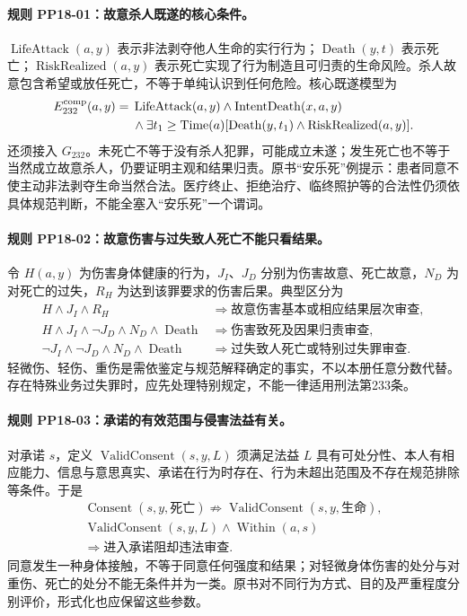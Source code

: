 \paragraph{规则 PP18-01：故意杀人既遂的核心条件。}
\mbox{}\par
$\operatorname{LifeAttack}(a,y)$ 表示非法剥夺他人生命的实行行为；$\operatorname{Death}(y,t)$ 表示死亡；$\operatorname{RiskRealized}(a,y)$ 表示死亡实现了行为制造且可归责的生命风险。杀人故意包含希望或放任死亡，不等于单纯认识到任何危险。核心既遂模型为
\[
\begin{aligned}
E_{232}^{\rm comp}(a,y)={}&\operatorname{LifeAttack}(a,y)
\land\operatorname{IntentDeath}(x,a,y)\\
&\land\exists t_1\ge\operatorname{Time}(a)
[\operatorname{Death}(y,t_1)\land\operatorname{RiskRealized}(a,y)].
\end{aligned}
\]
还须接入 $G_{232}$。未死亡不等于没有杀人犯罪，可能成立未遂；发生死亡也不等于当然成立故意杀人，仍要证明主观和结果归责。原书“安乐死”例提示：患者同意不使主动非法剥夺生命当然合法。医疗终止、拒绝治疗、临终照护等的合法性仍须依具体规范判断，不能全塞入“安乐死”一个谓词。

\paragraph{规则 PP18-02：故意伤害与过失致人死亡不能只看结果。}
\mbox{}\par
令 $H(a,y)$ 为伤害身体健康的行为，$J_I$、$J_D$ 分别为伤害故意、死亡故意，$N_D$ 为对死亡的过失，$R_H$ 为达到该罪要求的伤害后果。典型区分为
\[
\begin{aligned}
H\land J_I\land R_H&\Rightarrow\text{故意伤害基本或相应结果层次审查},\\
H\land J_I\land\neg J_D\land N_D\land\operatorname{Death}
&\Rightarrow\text{伤害致死及因果归责审查},\\
\neg J_I\land\neg J_D\land N_D\land\operatorname{Death}
&\Rightarrow\text{过失致人死亡或特别过失罪审查}.
\end{aligned}
\]
轻微伤、轻伤、重伤是需依鉴定与规范解释确定的事实，不以本册任意分数代替。存在特殊业务过失罪时，应先处理特别规定，不能一律适用刑法第233条。

\paragraph{规则 PP18-03：承诺的有效范围与侵害法益有关。}
\mbox{}\par
对承诺 $s$，定义 $\operatorname{ValidConsent}(s,y,L)$ 须满足法益 $L$ 具有可处分性、本人有相应能力、信息与意思真实、承诺在行为时存在、行为未超出范围及不存在规范排除等条件。于是
\[
\begin{gathered}
\operatorname{Consent}(s,y,\text{死亡})
\not\Rightarrow\operatorname{ValidConsent}(s,y,\text{生命}),\\
\operatorname{ValidConsent}(s,y,L)\land\operatorname{Within}(a,s)\\
\Rightarrow\text{进入承诺阻却违法审查}.
\end{gathered}
\]
同意发生一种身体接触，不等于同意任何强度和结果；对轻微身体伤害的处分与对重伤、死亡的处分不能无条件并为一类。原书对不同行为方式、目的及严重程度分别评价，形式化也应保留这些参数。

